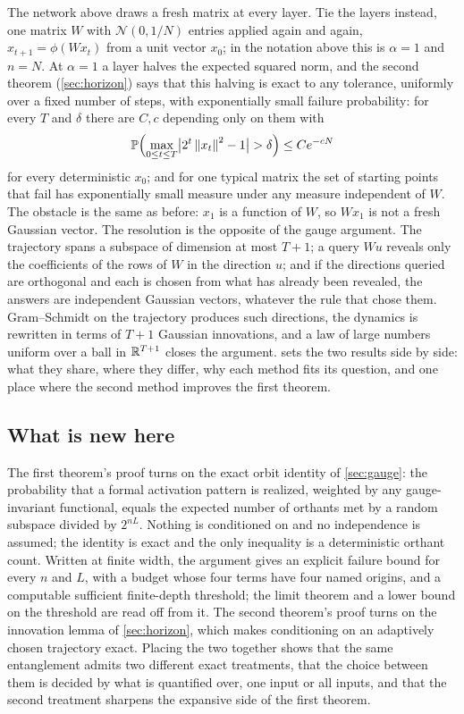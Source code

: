 The network above draws a fresh matrix at every layer. Tie the layers instead, one matrix $W$ with $\mathcal N(0,1/N)$ entries applied again and again, $x_{t+1}=\phi(Wx_t)$ from a unit vector $x_0$; in the notation above this is $\alpha=1$ and $n=N$. At $\alpha=1$ a layer halves the expected squared norm, and the second theorem (\cref{sec:horizon}) says that this halving is exact to any tolerance, uniformly over a fixed number of steps, with exponentially small failure probability: for every $T$ and $\delta$ there are $C,c$ depending only on them with
\[
\PP\Bigl(\max_{0\le t\le T}\bigl|2^t\norm{x_t}^2-1\bigr|>\delta\Bigr)\le Ce^{-cN}
\]
for every deterministic $x_0$; and for one typical matrix the set of starting points that fail has exponentially small measure under any measure independent of $W$. The obstacle is the same as before: $x_1$ is a function of $W$, so $Wx_1$ is not a fresh Gaussian vector. The resolution is the opposite of the gauge argument. The trajectory spans a subspace of dimension at most $T+1$; a query $Wu$ reveals only the coefficients of the rows of $W$ in the direction $u$; and if the directions queried are orthogonal and each is chosen from what has already been revealed, the answers are independent Gaussian vectors, whatever the rule that chose them. Gram--Schmidt on the trajectory produces such directions, the dynamics is rewritten in terms of $T+1$ Gaussian innovations, and a law of large numbers uniform over a ball in $\mathbb{R}^{T+1}$ closes the argument.  sets the two results side by side: what they share, where they differ, why each method fits its question, and one place where the second method improves the first theorem.

\subsection{What is new here}

The first theorem's proof turns on the exact orbit identity of \cref{sec:gauge}: the probability that a formal activation pattern is realized, weighted by any gauge-invariant functional, equals the expected number of orthants met by a random subspace divided by $2^{nL}$. Nothing is conditioned on and no independence is assumed; the identity is exact and the only inequality is a deterministic orthant count. Written at finite width, the argument gives an explicit failure bound for every $n$ and $L$, with a budget whose four terms have four named origins, and a computable sufficient finite-depth threshold; the limit theorem and a lower bound on the threshold are read off from it. The second theorem's proof turns on the innovation lemma of \cref{sec:horizon}, which makes conditioning on an adaptively chosen trajectory exact. Placing the two together shows that the same entanglement admits two different exact treatments, that the choice between them is decided by what is quantified over, one input or all inputs, and that the second treatment sharpens the expansive side of the first theorem.


